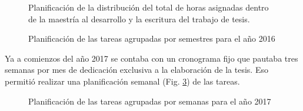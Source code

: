 \begin{figure}[!h]
  \centering
  \caption{Planificaci\'on de la distribuci\'on del total de horas asignadas dentro de la maestr\'ia al desarrollo y la escritura del trabajo de tesis.}
  \label{fig:disths}
\end{figure}

\begin{figure}[H]
  \centering
  \caption{Planificaci\'on de las tareas agrupadas por semestres para el año 2016}
  \label{fig:plan2016}
\end{figure}

Ya a comienzos del año 2017 se contaba con un cronograma fijo que pautaba tres semanas por mes de dedicaci\'on exclusiva a la elaboraci\'on de la tesis. Eso permiti\'o realizar una planificaci\'on semanal (Fig. \ref{fig:plan2017}) de las tareas. 

\begin{figure}[H]
  \centering
  \caption{Planificaci\'on de las tareas agrupadas por semanas para el año 2017}
  \label{fig:plan2017}
\end{figure}

